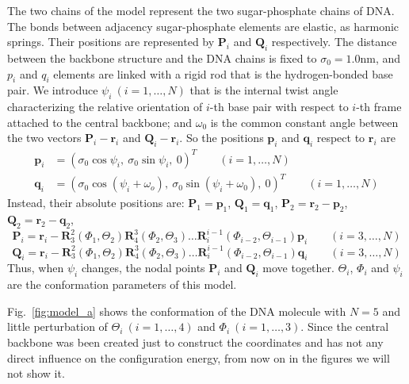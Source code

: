 \documentclass[a4paper,10pt]{article}
\begin{document}
The two chains of the model represent the two sugar-phosphate chains of DNA.
The bonds between adjacency sugar-phosphate elements are elastic, as harmonic springs.
Their positions are represented by $\textbf{P}_i$ and $\textbf{Q}_i$ respectively.
The distance between the backbone structure and the DNA chains is fixed to $\sigma_0=1.0$\si{\nm}, and $p_{i}$ and $q_{i}$ elements are linked with a rigid rod that is the hydrogen-bonded base pair.
We introduce $\psi_i\ (i=1,\dots,N)$ that is the internal twist angle characterizing the relative orientation of $i$-th base pair with respect to $i$-th frame attached to the central backbone;
and $\omega_0$ is the common constant angle between the two vectors $\textbf{P}_i-\textbf{r}_i$ and $\textbf{Q}_i-\textbf{r}_i$.
So the positions $\textbf{p}_i$ and $\textbf{q}_i$ respect to $\textbf{r}_i$ are
\begin{equation}
\begin{split}
\textbf{p}_i & =\left(\sigma_0\cos\psi_i,\ \sigma_0\sin\psi_i,\ 0\right)^T \qquad (i=1,\dots,N) \\
\textbf{q}_i & =\left(\sigma_0\cos\left(\psi_i+\omega_o\right),\ \sigma_0\sin\left(\psi_i+\omega_0\right),\ 0\right)^T \qquad (i=1,\dots,N)
\end{split}
\end{equation}
Instead, their absolute positions are: $\textbf{P}_1=\textbf{p}_1$, $\textbf{Q}_1=\textbf{q}_1$, $\textbf{P}_2=\textbf{r}_2-\textbf{p}_2$, $\textbf{Q}_2=\textbf{r}_2-\textbf{q}_2$,
\begin{equation}
\textbf{P}_i=\textbf{r}_i-\textbf{R}^{2}_{3}\left(\Phi_1,\Theta_2\right)\textbf{R}^{3}_{4}\left(\Phi_2,\Theta_3\right)\dots\textbf{R}^{i-1}_{i}\left(\Phi_{i-2},\Theta_{i-1}\right)\textbf{p}_i\qquad (i=3,\dots,N)
\end{equation}
\begin{equation}
\textbf{Q}_i=\textbf{r}_i-\textbf{R}^{2}_{3}\left(\Phi_1,\Theta_2\right)\textbf{R}^{3}_{4}\left(\Phi_2,\Theta_3\right)\dots\textbf{R}^{i-1}_{i}\left(\Phi_{i-2},\Theta_{i-1}\right)\textbf{q}_i\qquad (i=3,\dots,N)
\end{equation}
Thus, when $\psi_i$ changes, the nodal points $\textbf{P}_i$ and $\textbf{Q}_i$ move together.
$\Theta_i$, $\Phi_i$ and $\psi_i$ are the conformation parameters of this model.

Fig.~\ref{fig:model_a} shows the conformation of the DNA molecule with $N=5$ and little perturbation of $\Theta_{i}\ \left (i = 1,\dots,4\right )$ and $\Phi_{i}\ \left (i = 1,\dots,3\right )$.
Since the central backbone was been created just to construct the coordinates and has not any direct influence on the configuration energy, from now on in the figures we will not show it.
\end{document}
